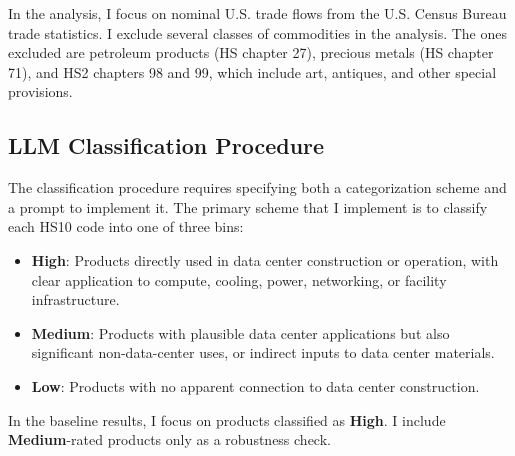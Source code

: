 \documentclass[12pt,pdftex]{article}
\begin{document}
\begin{onehalfspacing}
In the analysis, I focus on nominal U.S. trade flows from the U.S. Census Bureau trade statistics. I exclude several classes of commodities in the analysis. The ones excluded are petroleum products (HS chapter 27), precious metals (HS chapter 71), and HS2 chapters 98 and 99, which include art, antiques, and other special provisions. 

\subsection{LLM Classification Procedure}

The classification procedure requires specifying both a categorization scheme and a prompt to implement it. The primary scheme that I implement is to classify each HS10 code into one of three bins:
\begin{itemize}
    \item \textbf{High}: Products directly used in data center construction or operation, with clear application to compute, cooling, power, networking, or facility infrastructure.
    \item \textbf{Medium}: Products with plausible data center applications but also significant non-data-center uses, or indirect inputs to data center materials.
    \item \textbf{Low}: Products with no apparent connection to data center construction.
\end{itemize}
In the baseline results, I focus on products classified as \textbf{High}. I include \textbf{Medium}-rated products only as a robustness check.


\end{onehalfspacing}
\end{document}
